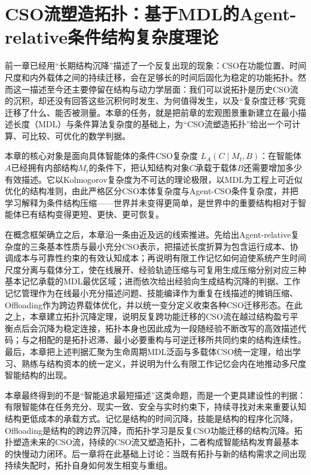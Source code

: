 \chapter{CSO流塑造拓扑：基于MDL的Agent-relative条件结构复杂度理论}
\label{chap:cso-mdl-topology}

\begin{chapterlead}
前一章已经用“长期结构沉降”描述了一个反复出现的现象：CSO在功能位置、时间尺度和内外载体之间的持续迁移，会在足够长的时间后固化为稳定的功能拓扑。然而这一描述至今还主要停留在结构与动力学层面：我们可以说拓扑是历史CSO流的沉积，却还没有回答这些沉积何时发生、为何值得发生，以及“复杂度迁移”究竟迁移了什么、能否被测量。本章的任务，就是把前章的宏观图景重新建立在最小描述长度（MDL）与条件算法复杂度的基础上，为“CSO流塑造拓扑”给出一个可计算、可比较、可优化的数学判据。

本章的核心对象是面向具体智能体的条件CSO复杂度 $L_A(C\mid M_t,B)$：在智能体$A$已经拥有内部结构$M_t$的条件下，把认知结构对象$C$承载于载体$B$还需要增加多少有效描述。它以Kolmogorov复杂度为不可达的理论极限，以MDL为工程上可近似优化的结构准则，由此严格区分CSO本体复杂度与Agent-CSO条件复杂度，并把学习解释为条件结构压缩——世界并未变得更简单，是世界中的重要结构相对于智能体已有结构变得更短、更快、更可恢复。

在概念框架确立之后，本章沿一条由近及远的线索推进。先给出Agent-relative复杂度的三条基本性质与最小充分CSO表示，把描述长度折算为包含运行成本、协调成本与可靠性约束的有效认知成本；再说明有限工作记忆如何迫使系统产生时间尺度分离与载体分工，使在线展开、经验轨迹压缩与可复用生成压缩分别对应三种基本记忆承载的MDL最优区域；进而依次给出经验向生成结构沉降的判据、工作记忆管理作为在线最小充分描述问题、技能编译作为重复在线描述的摊销压缩、Offloading作为跨边界载体优化，并以统一变分定义收束各种CSO迁移形态。在此之上，本章建立拓扑沉降定理，说明反复跨功能迁移的CSO流在越过结构盈亏平衡点后会沉降为稳定连接，拓扑本身也因此成为一段随经验不断改写的高效描述代码；与之相配的是拓扑迟滞、最小必要重构与可逆迁移所共同约束的结构连续性。最后，本章把上述判据汇聚为生命周期MDL泛函与多载体CSO统一定理，给出学习、熟练与结构资本的统一定义，并说明为什么有限工作记忆会内在地推动多尺度智能结构的出现。

本章最终得到的不是“智能追求最短描述”这类命题，而是一个更具建设性的判据：有限智能体在任务充分、现实一致、安全与实时约束下，持续寻找对未来重要认知结构更低成本的承载方式。记忆是结构的时间沉降，技能是结构的程序化沉降，Offloading是结构的跨边界沉降，而拓扑学习是反复CSO功能迁移的结构沉降。拓扑塑造未来的CSO流，持续的CSO流又塑造拓扑，二者构成智能结构发育最基本的快慢动力闭环。后一章将在此基础上讨论：当既有拓扑与新的结构需求之间出现持续失配时，拓扑自身如何发生相变与重组。
\end{chapterlead}

